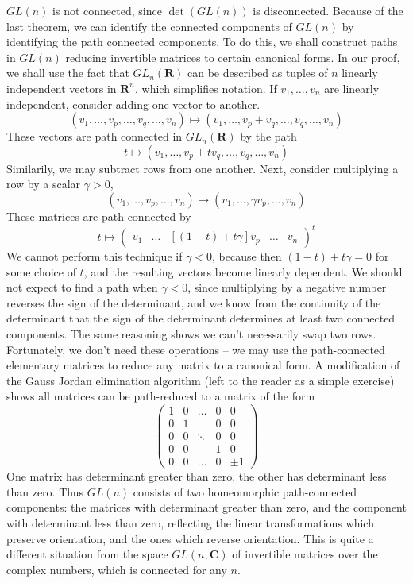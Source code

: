 \begin{example}
    $GL(n)$ is not connected, since $\det(GL(n))$ is disconnected. Because of the last theorem, we can identify the connected components of $GL(n)$ by identifying the path connected components. To do this, we shall construct paths in $GL(n)$ reducing invertible matrices to certain canonical forms. In our proof, we shall use the fact that $GL_n(\mathbf{R})$ can be described as tuples of $n$ linearly independent vectors in $\mathbf{R}^n$, which simplifies notation. If $v_1, \dots, v_n$ are linearly independent, consider adding one vector to another.
    \[ (v_1, \dots, v_p, \dots, v_q, \dots, v_n) \mapsto (v_1, \dots, v_p + v_q, \dots, v_q, \dots, v_n) \]
    These vectors are path connected in $GL_n(\mathbf{R})$ by the path
    \[ t \mapsto (v_1, \dots, v_p + t v_q, \dots, v_q, \dots, v_n) \]
    Similarily, we may subtract rows from one another. Next, consider multiplying a row by a scalar $\gamma > 0$,
    \[ (v_1, \dots, v_p, \dots, v_n) \mapsto (v_1, \dots, \gamma v_p, \dots, v_n) \]
    These matrices are path connected by
    \[ t \mapsto \begin{pmatrix} v_1 & \dots & [(1-t) + t \gamma]v_p & \dots & v_n \end{pmatrix}^t \]
    We cannot perform this technique if $\gamma < 0$, because then $(1-t) + t \gamma = 0$ for some choice of $t$, and the resulting vectors become linearly dependent. We should not expect to find a path when $\gamma < 0$, since multiplying by a negative number reverses the sign of the determinant, and we know from the continuity of the determinant that the sign of the determinant determines at least two connected components. The same reasoning shows we can't necessarily swap two rows. Fortunately, we don't need these operations -- we may use the path-connected elementary matrices to reduce any matrix to a canonical form. A modification of the Gauss Jordan elimination algorithm (left to the reader as a simple exercise) shows all matrices can be path-reduced to a matrix of the form
    \[ \begin{pmatrix} 1 & 0 & \dots & 0 & 0 \\ 0 & 1 & & 0 & 0 \\ 0 & 0 & \ddots & 0 & 0 \\ 0 & 0 &  & 1 & 0 \\ 0 & 0 & \dots & 0 & \pm 1 \end{pmatrix} \]
    One matrix has determinant greater than zero, the other has determinant less than zero. Thus $GL(n)$ consists of two homeomorphic path-connected components: the matrices with determinant greater than zero, and the component with determinant less than zero, reflecting the linear transformations which preserve orientation, and the ones which reverse orientation. This is quite a different situation from the space $GL(n,\mathbf{C})$ of invertible matrices over the complex numbers, which is connected for any $n$.
\end{example}

